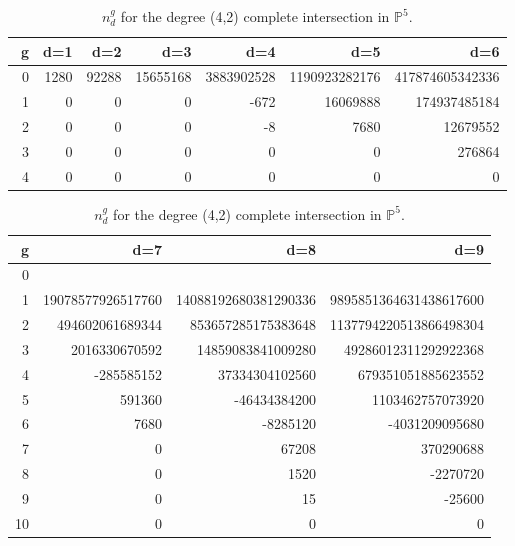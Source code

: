 \documentclass[12pt]{article}
\begin{document}
\begin{table}
\begin{centering}
\begin{tabular}{|r|rrrrrr|}
\hline
g &d=1 &d=2 &d=3 &d=4 &d=5 &d=6\\
\hline
\, 0& 1280& 92288& 15655168& 3883902528& 1190923282176& 417874605342336  \\
1& 0&0& 0& -672& 16069888& 174937485184\\
2& 0& 0& 0& -8& 7680& 12679552\\
3& 0& 0& 0& 0& 0& 276864\\
4& 0& 0& 0& 0& 0& 0\\
\hline
\end{tabular}
\begin{tabular}{|r|rrr|}
\hline
g &d=7 &d=8 &d=9\\
\hline
0& \! 160964588281789696&  \!\! 66392895625625639488&  \!\! 28855060316616488359936 \\
1&  19078577926517760& 14088192680381290336& 9895851364631438617600\\
2&  494602061689344& 853657285175383648& 1137794220513866498304\\
3&  2016330670592& 14859083841009280& 49286012311292922368\\
4&  -285585152& 37334304102560& 679351051885623552\\
5& 591360& -46434384200& 1103462757073920\\
6& 7680& -8285120& -4031209095680\\
7&0& 67208& 370290688 \\
8& 0& 1520& -2270720 \\
9& 0& 15& -25600 \\
10&0& 0& 0\\
\hline
\end{tabular}

\caption{$n^g_d$ for the degree (4,2) complete intersection in $\mathbb{P}^5$.}
\end{centering}
\end{table}
\end{document}
